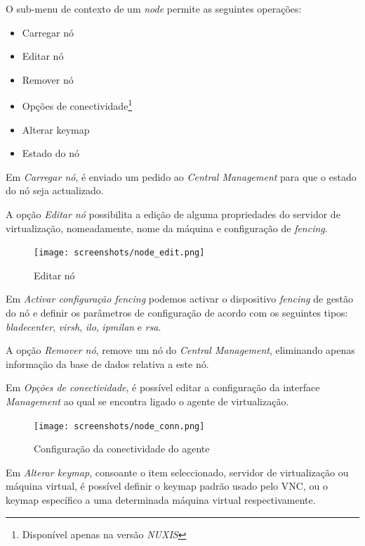 O sub-menu de contexto de um \emph{node} permite as seguintes operações:
\begin{itemize}
    \item Carregar nó
    \item Editar nó
    \item Remover nó
    \item Opções de conectividade\footnote{Disponível apenas na versão \emph{NUXIS}}
    \item Alterar keymap
    \item Estado do nó
\end{itemize}

Em \emph{Carregar nó}, é enviado um pedido ao \emph{Central Management} para que o estado do nó seja actualizado. 

A opção \emph{Editar nó} possibilita a edição de alguma propriedades do servidor de virtualização, nomeadamente, nome da máquina e configuração de \emph{fencing}.
\begin{figure}[H]
	\begin{center}
	\texttt{[image: screenshots/node\_edit.png]}
	\caption{Editar nó}
	\label{fig:node_edit}
	\end{center}
\end{figure}
\label{para:node_fencing_config}Em \emph{Activar configuração \emph{fencing}} podemos activar o dispositivo \emph{fencing} de gestão do nó e definir os parâmetros de configuração de acordo com os seguintes tipos: \emph{bladecenter}, \emph{virsh}, \emph{ilo}, \emph{ipmilan} e \emph{rsa}.

A opção \emph{Remover nó}, remove um nó do \emph{Central Management}, eliminando apenas informação da base de dados relativa a este nó.

Em \emph{Opções de conectividade}, é possível editar a configuração da interface \emph{Management} ao qual se encontra ligado o agente de virtualização.
\begin{figure}[H]
	\begin{center}
	\texttt{[image: screenshots/node\_conn.png]}
	\caption{Configuração da conectividade do agente}
	\label{fig:node_conn}
	\end{center}
\end{figure}

Em \emph{Alterar keymap}, consoante o item seleccionado, servidor de virtualização ou máquina virtual, é possível definir o keymap padrão usado pelo VNC, ou o keymap específico a uma determinada máquina virtual respectivamente.

